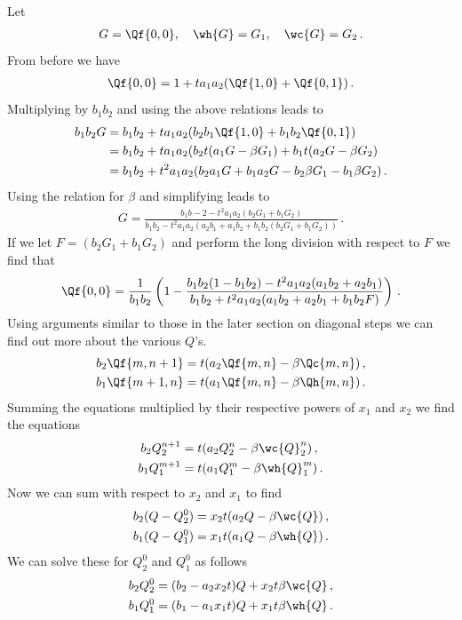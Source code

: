Let
\begin{align}
	G = \Qf{0,0}, \quad\wh{G} = G_1, \quad\wc{G} = G_2\,.
\end{align}
From before we have
\begin{align}
	\Qf{0,0} = 1 + t a_1a_2(\Qf{1,0}+\Qf{0,1})\,.
\end{align}
Multiplying by $b_1b_2$ and using the above relations leads to
\begin{align}
\begin{split}
b_1b_2 G &= b_1b_2 + ta_1a_2(b_2b_1\Qf{1,0}+b_1b_2\Qf{0,1})\\
                 &=b_1b_2 + ta_1a_2(b_2t(a_1G-\beta G_1)+b_1t(a_2 G- \beta G_2)\\
                 &=b_1b_2 + t^2a_1a_2(b_2a_1G+b_1a_2G-b_2\beta G_1-b_1\beta G_2)\,.
\end{split}
\end{align}
Using the relation for $\beta$ and simplifying leads to
\begin{align}
	G = \frac{b_1b-2 - t^2 a_1a_2(b_2G_1+b_1G_2)}{b_1b_2 - t^2a_1a_2 (a_2b_1+a_1b_2+b_1b_2(b_2G_1+b_1G_2))}\,.
\end{align}
If we let $F = (b_2G_1+b_1G_2)$ and perform the long division with respect to $F$ we find that
\begin{align}
	\Qf{0,0} = \frac{1}{b_1b_2}\left(1-\frac{b_1b_2(1-b_1b_2)-t^2a_1a_2(a_1b_2+a_2b_1)}{b_1b_2+t^2a_1a_2(a_1b_2+a_2b_1+b_1b_2 F)}\right)\,.
\end{align}
Using arguments similar to those in the later section on diagonal steps we can find out more about the various $Q$'s.
\begin{align}
	b_2\Qf{m,n+1} &= t(a_2\Qf{m,n}-\beta \Qc{m,n})\,,\\
	b_1\Qf{m+1,n} &= t(a_1\Qf{m,n}-\beta \Qh{m,n})\,.
\end{align}
Summing the equations multiplied by their respective powers of $x_1$ and $x_2$ we find the equations
\begin{align}
	b_2 Q_2^{n+1} &= t(a_2Q_2^n-\beta \wc{Q}_2^n)\,,\\
	b_1 Q_1^{m+1} &= t(a_1Q_1^m-\beta \wh{Q}_1^m)\,.
\end{align}
Now we can sum with respect to $x_2$ and $x_1$ to find
\begin{align}
	b_2 (Q-Q_2^0) &= x_2t(a_2Q - \beta \wc{Q})\,,\\
	b_1 (Q-Q_1^0) &= x_1t(a_1Q - \beta \wh{Q})\,.
\end{align}
We can solve these for $Q_2^0$ and $Q_1^0$ as follows
\begin{align}
	b_2Q_2^0 &= (b_2-a_2x_2t)Q + x_2t\beta \wc{Q}\,,\\
	b_1Q_1^0 &= (b_1-a_1x_1t)Q + x_1t\beta \wh{Q}\,.
\end{align}
